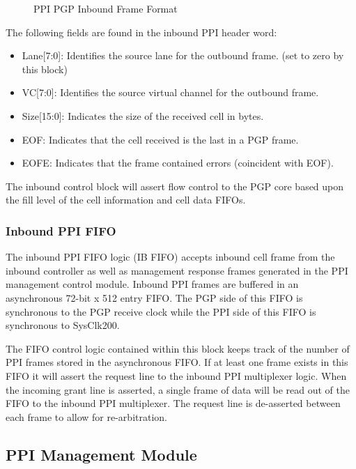 \documentclass[11pt]{article}
\begin{document}
\begin{figure}[H]
   \centering
   \caption{PPI PGP Inbound Frame Format}
   \label{fig:ppi_ib_lane_frame}
\end{figure}

The following fields are found in the inbound PPI header word:

\begin{itemize}
   \item Lane[7:0]: Identifies the source lane for the outbound frame. (set to zero by this block)
   \item VC[7:0]: Identifies the source virtual channel for the outbound frame.
   \item Size[15:0]: Indicates the size of the received cell in bytes.
   \item EOF: Indicates that the cell received is the last in a PGP frame.
   \item EOFE: Indicates that the frame contained errors (coincident with EOF).
\end{itemize}

The inbound control block will assert flow control to the PGP core based upon the fill level of the cell information and cell data FIFOs. 

\subsubsection{Inbound PPI FIFO}

The inbound PPI FIFO logic (IB FIFO) accepts inbound cell frame from the inbound controller as well as management response frames generated in the
PPI management control module. Inbound PPI frames are buffered in an asynchronous 72-bit x 512 entry FIFO. The PGP side of this
FIFO is synchronous to the PGP receive clock while the PPI side of this FIFO is synchronous to SysClk200. 

The FIFO control logic contained within this block keeps track of the number of PPI frames stored in the asynchronous FIFO. If at least
one frame exists in this FIFO it will assert the request line to the inbound PPI multiplexer logic. When the incoming grant line is
asserted, a single frame of data will be read out of the FIFO to the inbound PPI multiplexer. The request line is de-asserted between
each frame to allow for re-arbitration.

\subsection{PPI Management Module}
\label{subsec:PpiMgmtCntrl}
\end{document}

